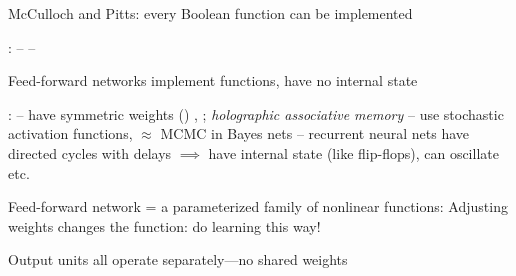 \documentclass{article}
\begin{document}
\begin{huge}

\vspace*{0.2in}

\textwidth
{}

McCulloch and Pitts: every Boolean function can be implemented




:\al
-- \al
-- 

Feed-forward networks implement functions, have no internal state

:\al
--  have symmetric weights ()\nl
   , ; \emph{holographic associative memory}\al
--  use stochastic activation functions, \nl
   $\approx$ MCMC in Bayes nets\al
-- recurrent neural nets have directed cycles with delays\nl
  $\implies$ have internal state (like flip-flops), can oscillate etc.



\vspace*{0.2in}

\textwidth
{}

Feed-forward network = a parameterized family of nonlinear functions:
Adjusting weights changes the function: do learning this way!




Output units all operate separately---no shared weights


\end{huge}
\end{document}
